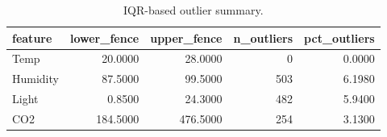 \begin{table}
\caption{IQR-based outlier summary.}
\label{tab:outliers}
\begin{tabular}{lrrrr}
\toprule
feature & lower\_fence & upper\_fence & n\_outliers & pct\_outliers \\
\midrule
Temp & 20.0000 & 28.0000 & 0 & 0.0000 \\
Humidity & 87.5000 & 99.5000 & 503 & 6.1980 \\
Light & 0.8500 & 24.3000 & 482 & 5.9400 \\
CO2 & 184.5000 & 476.5000 & 254 & 3.1300 \\
\bottomrule
\end{tabular}
\end{table}
